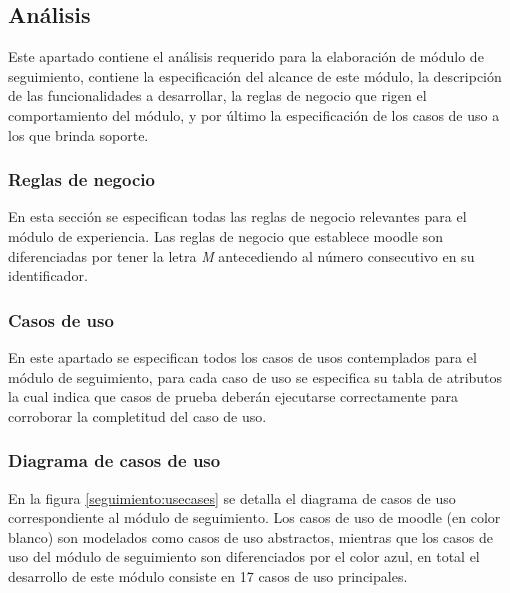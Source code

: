 
\subsection{Análisis}

 Este apartado contiene el análisis requerido para la elaboración de módulo de seguimiento,
 contiene la especificación del alcance de este módulo, la descripción de las funcionalidades
 a desarrollar, la reglas de negocio que rigen el comportamiento del módulo, y por último la
 especificación de los casos de uso a los que brinda soporte.

\subsubsection{Reglas de negocio} %

 En esta sección se especifican todas las reglas de negocio relevantes para el módulo de
 experiencia. Las reglas de negocio que establece moodle son diferenciadas por tener la letra {\it M}
 antecediendo al número consecutivo en su identificador.

\clearpage
\subsubsection{Casos de uso} %

 En este apartado se especifican todos los casos de usos contemplados para el módulo de
seguimiento, para cada caso de uso se especifica su tabla de atributos la cual indica que casos
 de prueba deberán ejecutarse correctamente para corroborar la completitud del caso de uso.

\subsubsection*{Diagrama de casos de uso}

 En la figura \ref{seguimiento:usecases} se detalla el diagrama de casos de uso correspondiente al módulo
 de seguimiento. Los casos de uso de moodle (en color blanco) son modelados como casos de uso
 abstractos, mientras que los casos de uso del módulo de seguimiento son diferenciados por el
 color azul, en total el desarrollo de este módulo consiste en 17 casos de uso principales.


